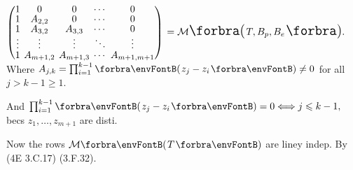 {\normalsize$\begin{pmatrix}
		1 &\hspace{-6pt} 0 &\hspace{-6pt} 0 &\hspace{-6pt} \cdots &\hspace{-6pt} 0\\[-2pt]
		1 &\hspace{-6pt} A_{2,2} &\hspace{-6pt} 0 &\hspace{-6pt} \cdots &\hspace{-6pt} 0\\[-2pt]
		1 &\hspace{-6pt} A_{3,2} &\hspace{-6pt} A_{3,3} &\hspace{-6pt} \cdots &\hspace{-6pt} 0\\[-2pt]
		\vdots &\hspace{-6pt} \vdots &\hspace{-6pt} \vdots &\hspace{-6pt} \ddots &\hspace{-6pt} \vdots\\[-2pt]
		1 &\hspace{-6pt} A_{m+1,2} &\hspace{-6pt} A_{m+1,3} &\hspace{-6pt} \cdots &\hspace{-6pt} A_{m+1,m+1}
	\end{pmatrix}$}${}=\Mt[\BigPar]{T,B_p,B_e}.$ Where $A_{j,k}=\prod_{i=1}^{k-1}\Par{z_j-z_i}\neq 0$ for all $j> k-1\geqslant 1.$\vspace{-74pt}\par\quad
\hfill And $\prod_{i=1}^{k-1}\Par{z_j-z_i}=0 \Longleftrightarrow j\leqslant k-1,$ becs $z_1,\dots,z_{m+1}$ are disti.\Blind{\quad\qquad}\vspace{30pt}\par\quad
\hfill Now the rows $\Mt{T}$ are liney indep. By (4E 3.C.17) \OR (3.F.32).\Blind{\quad}\PfEnd\vspace{3pt}
\SepLine


%

